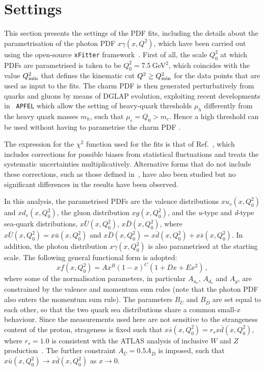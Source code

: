 \section{Settings}
\label{sec:fitsettings}

This section presents the settings of the PDF fits, including the details about the
parametrisation of the photon PDF $x\gamma(x,Q^2)$, which have been
carried out using the open-source {\tt xFitter}
framework~\cite{Alekhin:2014irh}.
%
First of all, the scale $Q_0^2$ at which PDFs are parametrised is taken to be
$Q_0^2 = 7.5~$GeV$^2$, which coincides with the value $Q_{\rm min}^2$ that defines
the kinematic cut $Q^2 \ge Q_{\rm min}^2$ for the
data points that are used as input to the fits.
%
The charm PDF is then generated perturbatively from quarks and gluons by
means of DGLAP evolution, exploiting recent developments in {\tt
  APFEL} which allow the setting of heavy-quark thresholds $\mu_h$
differently from the heavy quark masses $m_h$, such that
$\mu_c=Q_0 > m_c$. Hence a high threshold can be used without having to parametrise the charm PDF \cite{current:work}.

The expression for the $\chi^2$  function used for the fits is that
of Ref.~\cite{Aaron:2012qi}, which
includes corrections for possible 
biases from statistical fluctuations and treats the systematic uncertainties
multiplicatively.
%
Alternative forms that do not include these corrections, such as those
defined in~\cite{Aaron:2009aa,Abramowicz:2015mha},
have also been studied but no significant differences
in the results have been observed.
%

In this analysis, the parametrised PDFs are the valence distributions
$xu_{v}(x,Q_0^2)$ and $xd_{v}(x,Q_0^2)$, the gluon distribution $xg(x,Q_0^2)$, and the
\textit{u}-type and \textit{d}-type sea-quark distributions,
$x\bar{U}(x,Q_0^2)$, $x\bar{D}(x,Q_0^2)$, where $x\bar{U}(x,Q_0^2) = x\bar{u}(x,Q_0^2)$ and
$x\bar{D}(x,Q_0^2) = x\bar{d}(x,Q_0^2) + x\bar{s}(x,Q_0^2)$.
%
In addition, the photon distribution $x\gamma(x,Q_0^2)$ is also parametrised at the starting scale.
%
The following general functional form is adopted:
\begin{equation}
  \label{eq:parametrization}
xf(x, Q_0^2) = Ax^{B}(1-x)^{C}(1+Dx+Ex^{2}) \, ,
\end{equation}
where some of the normalisation parameters, in particular $A_{u_{v}}$,
$A_{d_{v}}$ and $A_{g}$, are constrained by the valence and momentum
sum rules (note that the photon PDF also enters the momentum sum rule).
%
The parameters $B_{\bar{U}}$ and $B_{\bar{D}}$ are set equal to each
other, so that the two quark sea distributions share a common
small-$x$ behaviour.
%
Since the measurements used here are not sensitive to the strangeness
content of the proton, strageness is fixed such that $x\bar{s} (x, Q_0^2) = r_sx\bar{d}(x,Q_0^2)$, where
$r_s=1.0$ is consistent with the ATLAS analysis of inclusive $W$
and $Z$ production~\cite{Aad:2012sb,Aaboud:2016btc}.
%
The further constraint $A_{\bar{U}} = 0.5 A_{\bar{D}}$ is imposed,
such that $x\bar{u}(x,Q_0^2) \to x\bar{d}(x,Q_0^2)$ as $x \to 0$.  

